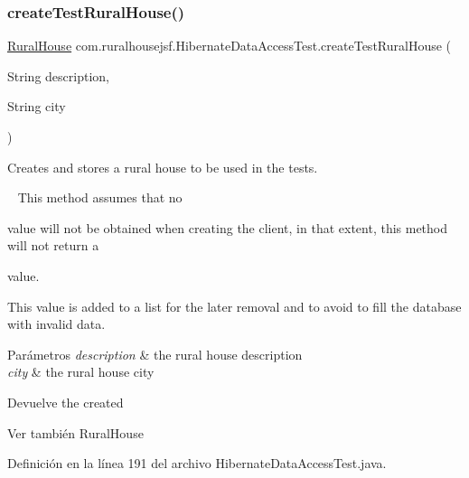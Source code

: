 \subsubsection{\texorpdfstring{createTestRuralHouse()}{createTestRuralHouse()}}
{\footnotesize\ttfamily \mbox{\hyperlink{classcom_1_1ruralhousejsf_1_1domain_1_1_rural_house}{Rural\+House}} com.\+ruralhousejsf.\+Hibernate\+Data\+Access\+Test.\+create\+Test\+Rural\+House (\begin{DoxyParamCaption}\item[{String}]{description,  }\item[{String}]{city }\end{DoxyParamCaption})\hspace{0.3cm}{\ttfamily [private]}}



Creates and stores a rural house to be used in the tests. 

~\newline
 This method assumes that no
\begin{DoxyCode}{0}
\DoxyCodeLine{\textcolor{keyword}{null} }
\end{DoxyCode}
 value will not be obtained when creating the client, in that extent, this method will not return a 
\begin{DoxyCode}{0}
\DoxyCodeLine{\textcolor{keyword}{null} }
\end{DoxyCode}
 value. 

This value is added to a list for the later removal and to avoid to fill the database with invalid data.


\begin{DoxyParams}{Parámetros}
{\em description} & the rural house description \\
\hline
{\em city} & the rural house city\\
\hline
\end{DoxyParams}
\begin{DoxyReturn}{Devuelve}
the created
\begin{DoxyCode}{0}
\end{DoxyCode}

\end{DoxyReturn}
\begin{DoxySeeAlso}{Ver también}
Rural\+House 
\end{DoxySeeAlso}


Definición en la línea 191 del archivo Hibernate\+Data\+Access\+Test.\+java.

\mbox{\label{classcom_1_1ruralhousejsf_1_1_hibernate_data_access_test_a71fef61bb66234d92d84ddd795de842a}} 
